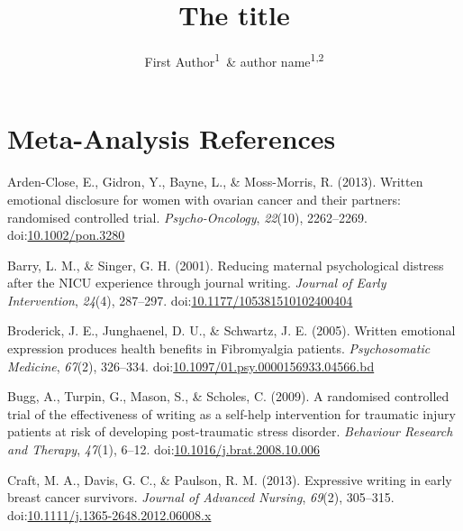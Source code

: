 \documentclass[english,man]{apa6}
\title{The title}
\author{First Author\textsuperscript{1}~\& author name\textsuperscript{1,2}}
\affiliation{
    \vspace{0.5cm}
          \textsuperscript{1} institution1\\
          \textsuperscript{2} institution2  }
\theoremstyle{definition}
\theoremstyle{definition}
\theoremstyle{definition}
\theoremstyle{remark}
\begin{document}
\maketitle

\setcounter{secnumdepth}{0}



\newpage

\setcounter{page}{1}

\section{Meta-Analysis References}\label{meta-analysis-references}

\setlength{\parindent}{-0.5in} \setlength{\leftskip}{0.5in}

\hypertarget{refs}{}
\hypertarget{ref-Arden-Close2013}{}
Arden-Close, E., Gidron, Y., Bayne, L., \& Moss-Morris, R. (2013).
Written emotional disclosure for women with ovarian cancer and their
partners: randomised controlled trial. \emph{Psycho-Oncology},
\emph{22}(10), 2262--2269.
doi:\href{https://doi.org/10.1002/pon.3280}{10.1002/pon.3280}

\hypertarget{ref-Barry2001}{}
Barry, L. M., \& Singer, G. H. (2001). Reducing maternal psychological
distress after the NICU experience through journal writing.
\emph{Journal of Early Intervention}, \emph{24}(4), 287--297.
doi:\href{https://doi.org/10.1177/105381510102400404}{10.1177/105381510102400404}

\hypertarget{ref-Broderick2005}{}
Broderick, J. E., Junghaenel, D. U., \& Schwartz, J. E. (2005). Written
emotional expression produces health benefits in Fibromyalgia patients.
\emph{Psychosomatic Medicine}, \emph{67}(2), 326--334.
doi:\href{https://doi.org/10.1097/01.psy.0000156933.04566.bd}{10.1097/01.psy.0000156933.04566.bd}

\hypertarget{ref-Bugg2009}{}
Bugg, A., Turpin, G., Mason, S., \& Scholes, C. (2009). A randomised
controlled trial of the effectiveness of writing as a self-help
intervention for traumatic injury patients at risk of developing
post-traumatic stress disorder. \emph{Behaviour Research and Therapy},
\emph{47}(1), 6--12.
doi:\href{https://doi.org/10.1016/j.brat.2008.10.006}{10.1016/j.brat.2008.10.006}

\hypertarget{ref-Craft2013}{}
Craft, M. A., Davis, G. C., \& Paulson, R. M. (2013). Expressive writing
in early breast cancer survivors. \emph{Journal of Advanced Nursing},
\emph{69}(2), 305--315.
doi:\href{https://doi.org/10.1111/j.1365-2648.2012.06008.x}{10.1111/j.1365-2648.2012.06008.x}
\end{document}

